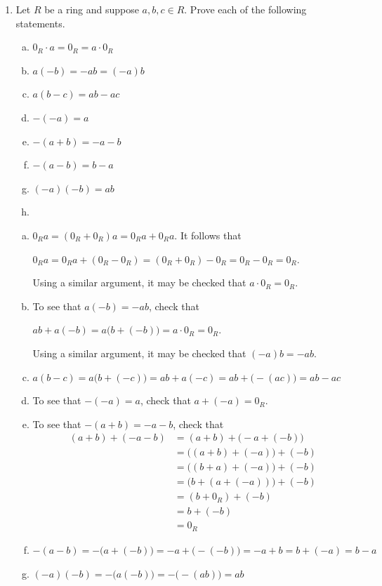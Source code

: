 \documentclass[11pt,fleqn,dvipsnames,usenames]{article}
\newcommand{\p}{\noindent}
\begin{document}
\p {\huge \S4.3 Problems}
\vsp

\begin{enumerate}[1.]
\item Let $R$ be a ring and suppose $a,b,c\in R$.  Prove each of the following statements.
\begin{multicols}{2}
\begin{enumerate}[(a)]
\item $0_{R}\cdot a = 0_{R} = a\cdot 0_{R}$
\item $a(-b) = -ab = (-a)b$
\item $a(b-c) = ab - ac$
\item $-(-a) = a$
\item $-(a+b) = -a - b$
\item $-(a-b) = b - a$
\item $(-a)(-b) = ab$
\item[\ ] 
\end{enumerate}
\end{multicols}
\vsmsp

\solution
\begin{enumerate}[(a)]
\item $0_{R}a = (0_{R} + 0_{R})a = 0_{R}a + 0_{R}a$.  It follows that
\begin{center}
$0_{R}a = 0_{R}a + (0_{R} - 0_{R}) = (0_{R} + 0_{R}) - 0_{R} = 0_{R} - 0_{R} = 0_{R}$.
\end{center}
Using a similar argument, it may be checked that $a\cdot 0_{R} = 0_{R}$.
\item To see that $a(-b) = -ab$, check that
\begin{center}
$ab + a(-b) = a\big(b + (-b)\big) = a\cdot 0_{R} = 0_{R}$.
\end{center}
Using a similar argument, it may be checked that $(-a)b = -ab$.
\item $a(b-c) = a\big(b + (-c)\big) = ab + a(-c) = ab + \big(-(ac)\big) = ab - ac$
\item To see that $-(-a) = a$, check that $a + (-a) = 0_{R}$.
\item To see that $-(a+b) = -a - b$, check that
\begin{align*}
(a+b) + (-a - b) &= (a+b) + \big(-a + (-b)\big)\\
&= \big((a + b) + (-a)\big) + (-b)\\
&= \big((b + a) + (-a)\big) + (-b)\\
&= \big(b + (a + (-a))\big) + (-b)\\
&= (b + 0_{R}) + (-b)\\
&= b + (-b)\\
&= 0_{R}
\end{align*}
\item $-(a-b) = -\big(a + (-b)\big) = -a + \big(-(-b)\big) = -a + b = b + (-a) = b-a$
\item $(-a)(-b) = -\big(a(-b)\big) = -\big(-(ab)\big) = ab$
\end{enumerate}


\end{enumerate}
\end{document}
